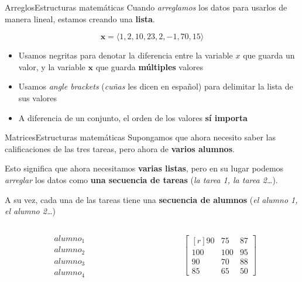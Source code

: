 \documentclass[spanish, c]{beamer}
\begin{document}
\begin{frame}{Arreglos}{Estructuras matemáticas}
    Cuando \textit{arreglamos} los datos para usarlos de manera lineal, estamos creando una \textbf{lista}. \pause

    $$\mathbf{x} = \langle 1, 2, 10, 23, 2, -1, 70, 15\rangle$$

    \begin{itemize}[<+->]
        \item Usamos negritas para denotar la diferencia entre la variable $x$ que guarda un valor, y la variable $\mathbf{x}$ que guarda \textbf{múltiples} valores
        \item Usamos \textit{angle brackets} (\textit{cuñas} les dicen en español) para delimitar la lista de sus valores
        \item A diferencia de un conjunto, el orden de los valores \textbf{sí importa}
    \end{itemize}

\end{frame}

\begin{frame}{Matrices}{Estructuras matemáticas}
    Supongamos que ahora necesito saber las calificaciones de las tres tareas, pero ahora de \textbf{varios alumnos}.

    Esto significa que ahora necesitamos \textbf{varias listas}, pero en su lugar podemos \textit{arreglar} los datos como \textbf{una secuencia de tareas} (\textit{la tarea 1, la tarea 2\dots}). \pause
    
    A su vez, cada una de las tareas tiene una \textbf{secuencia de alumnos} (\textit{el alumno 1, el alumno 2\dots}) \pause

    \begin{columns}
        \begin{column}{0.5\textwidth}
            \begin{align*}
                & alumno_1 \\
                & alumno_2 \\
                & alumno_3 \\
                & alumno_4
            \end{align*}
        \end{column}

        \begin{column}{0.5\textwidth}
            \begin{align*}
                \begin{bmatrix*}[r]
                    90 & 75 & 87 \\
                    100 & 100 & 95 \\
                    90 & 70 & 88 \\
                    85 & 65 & 50
                \end{bmatrix*}
            \end{align*}
        \end{column}
    \end{columns}
\end{frame}
\end{document}
